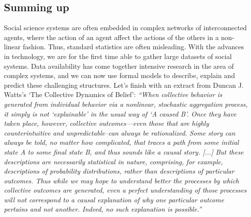 
%








\subsection{Summing up}
Social science systems are often embedded in complex networks of interconnected agents, 
where the action of an agent affect the actions of the others in a non-linear fashion.
Thus, standard statistics are often misleading.
With the advances in technology, 
we are for the first time able to gather large datasets of social systems.
Data availability has come together intensive research in the area of complex systems,
and we can now use formal models to describe, explain and predict these challenging structures.
Let's finish with an extract from Duncan J. Watts's `The Collective Dynamics of Belief': \textit{``When collective behavior is generated from individual behavior via a nonlinear, stochastic aggregation process, it simply is not `explainable' in the usual way of `A caused B'. Once they have taken place, however, collective outcomes—even those that are highly counterintuitive and unpredictable--can always be rationalized. Some story can always be told, no matter how complicated, that traces a path from some initial state A to some final state B, and thus sounds like a causal story.
[...]
But these descriptions are necessarily statistical in nature, comprising, for example, descriptions of probability distributions, rather than descriptions of particular outcomes. 
Thus while we may hope to understand better the processes by which collective outcomes are generated, even a perfect understanding of those processes will not correspond to a causal explanation of why one particular outcome pertains and not another. Indeed, no such explanation is possible.''}



